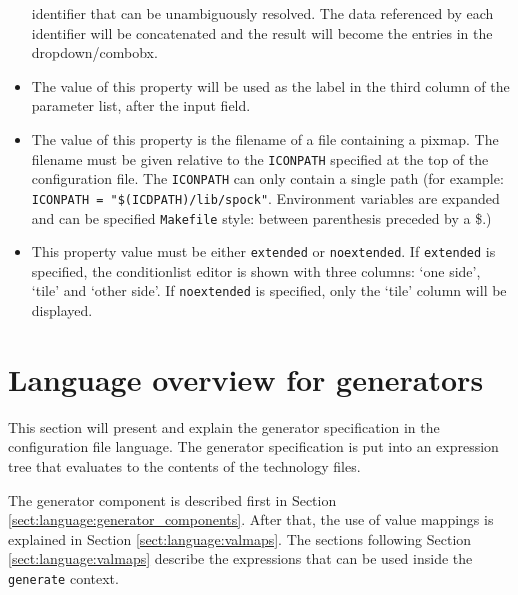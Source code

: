 \begin{itemize}
identifier that can be unambiguously resolved. The data referenced by each
identifier will be concatenated and the result will become the entries in the
dropdown/combobx.
\item[\R{unit1}] The value of this property will be used as the label in the third column of the parameter
list, after the input field.
\item[\R{pixmap1}] The value of this property is the filename of a file
containing a pixmap. The filename must be given relative to the
\texttt{ICONPATH} specified at the top of the configuration file. The
\texttt{ICONPATH} can only contain a single path (for example: \texttt{ICONPATH
= "\$(ICDPATH)/lib/spock"}. Environment variables are expanded and can be
specified \texttt{Makefile} style: between parenthesis preceded by a \$.)
\item[\R{option1}] This property value must be either \texttt{extended} or
\texttt{noextended}. If \texttt{extended} is specified, the conditionlist
editor is shown with three columns: `one side', `tile' and `other side'. If
\texttt{noextended} is specified, only the `tile' column will be displayed.
\end{itemize}
\normalsize


\section{Language overview for generators} \label{sect:language:generatorref}
This section will present and explain the generator specification in the
configuration file language. The generator specification is put into an
expression tree that evaluates to the contents of the technology files.

The generator component is described first in Section
\ref{sect:language:generator_components}. After that, the use of value mappings
is explained in Section \ref{sect:language:valmaps}. The sections following
Section \ref{sect:language:valmaps} describe the expressions that can be used
inside the \verb=generate= context.

